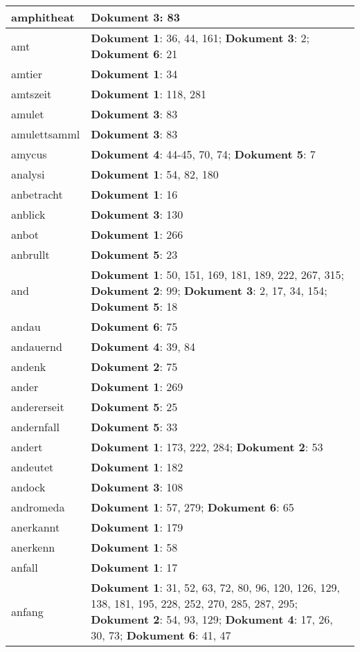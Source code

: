 \documentclass[a5paper]{article}
\begin{document}
\begin{longtable}[l]{|l|p{3in}|}
amphitheat & \textbf{Dokument 3}: 83 \\
\hline
amt & \textbf{Dokument 1}: 36, 44, 161; \textbf{Dokument 3}: 2; \textbf{Dokument 6}: 21 \\
\hline
amtier & \textbf{Dokument 1}: 34 \\
\hline
amtszeit & \textbf{Dokument 1}: 118, 281 \\
\hline
amulet & \textbf{Dokument 3}: 83 \\
\hline
amulettsamml & \textbf{Dokument 3}: 83 \\
\hline
amycus & \textbf{Dokument 4}: 44-45, 70, 74; \textbf{Dokument 5}: 7 \\
\hline
analysi & \textbf{Dokument 1}: 54, 82, 180 \\
\hline
anbetracht & \textbf{Dokument 1}: 16 \\
\hline
anblick & \textbf{Dokument 3}: 130 \\
\hline
anbot & \textbf{Dokument 1}: 266 \\
\hline
anbrullt & \textbf{Dokument 5}: 23 \\
\hline
and & \textbf{Dokument 1}: 50, 151, 169, 181, 189, 222, 267, 315; \textbf{Dokument 2}: 99; \textbf{Dokument 3}: 2, 17, 34, 154; \textbf{Dokument 5}: 18 \\
\hline
andau & \textbf{Dokument 6}: 75 \\
\hline
andauernd & \textbf{Dokument 4}: 39, 84 \\
\hline
andenk & \textbf{Dokument 2}: 75 \\
\hline
ander & \textbf{Dokument 1}: 269 \\
\hline
andererseit & \textbf{Dokument 5}: 25 \\
\hline
andernfall & \textbf{Dokument 5}: 33 \\
\hline
andert & \textbf{Dokument 1}: 173, 222, 284; \textbf{Dokument 2}: 53 \\
\hline
andeutet & \textbf{Dokument 1}: 182 \\
\hline
andock & \textbf{Dokument 3}: 108 \\
\hline
andromeda & \textbf{Dokument 1}: 57, 279; \textbf{Dokument 6}: 65 \\
\hline
anerkannt & \textbf{Dokument 1}: 179 \\
\hline
anerkenn & \textbf{Dokument 1}: 58 \\
\hline
anfall & \textbf{Dokument 1}: 17 \\
\hline
anfang & \textbf{Dokument 1}: 31, 52, 63, 72, 80, 96, 120, 126, 129, 138, 181, 195, 228, 252, 270, 285, 287, 295; \textbf{Dokument 2}: 54, 93, 129; \textbf{Dokument 4}: 17, 26, 30, 73; \textbf{Dokument 6}: 41, 47 \\

\end{longtable}
\end{document}

